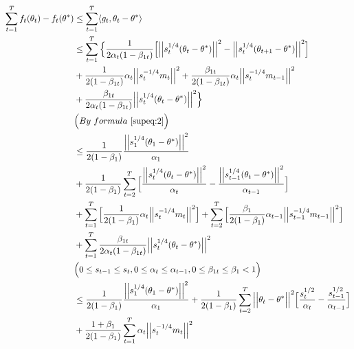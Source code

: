 \documentclass{article}
\begin{document}
\begin{align}
\label{supeq:3}
\sum_{t=1}^T f_t(\theta_t) - f_t(\theta^*) & \leq \sum_{t=1}^T\langle g_t, \theta_t - \theta^* \rangle \nonumber \\
& \leq \sum_{t=1}^T \Big \{ \frac{1}{2 \alpha_t (1- \beta_{1t})} \Big[ \Big \vert \Big \vert s_t^{1/4} (\theta_t - \theta^*)\Big \vert \Big \vert^2 - \Big \vert \Big \vert s_t^{1/4}(\theta_{t+1} - \theta^*) \Big \vert \Big \vert^2 \Big] \nonumber \\
&+ \frac{1}{2(1-\beta_{1t})} \alpha_t \Big \vert \Big \vert s_t^{-1/4}m_t \Big \vert \Big \vert^2 + \frac{\beta_{1t}}{2(1-\beta_{1t})} \alpha_t \Big \vert \Big \vert s_t^{-1/4} m_{t-1} \Big \vert \Big \vert^2 \nonumber \\
&+ \frac{\beta_{1t}}{2 \alpha_t (1-\beta_{1t})} \Big \vert \Big \vert s_t^{1/4}(\theta_t - \theta^*) \Big \vert \Big \vert^2 \Big \} \nonumber \\
&\Big( By\  formula ~\eqref{supeq:2} \Big) \nonumber \\
& \leq \frac{1}{2 (1 - \beta_1)} \frac{\Big \vert \Big \vert s_1^{1/4}(\theta_{1} - \theta^*) \Big \vert \Big \vert^2} {\alpha_1} \nonumber \\
& + \frac{1}{2 (1-\beta_1)} \sum_{t=2}^T \Big[ \frac{\Big \vert \Big \vert s_t^{1/4}(\theta_t - \theta^*) \Big \vert \Big \vert^2}{\alpha_t} - \frac{\Big \vert \Big \vert s_{t-1}^{1/4}(\theta_t - \theta^*) \Big \vert \Big \vert^2}{\alpha_{t-1}}  \Big ] \nonumber \\
&+ \sum_{t=1}^T \Big [ \frac{1}{2 (1 - \beta_1)} \alpha_t \Big \vert \Big \vert s_t^{-1/4} m_t \Big \vert \Big \vert^2 \Big] + \sum_{t=2}^T \Big[ \frac{\beta_1}{2 (1 - \beta_1)} \alpha_{t-1} \Big \vert \Big \vert s_{t-1}^{-1/4} m_{t-1} \Big \vert \Big \vert^2 \Big ] \nonumber \\
& + \sum_{t=1}^T \frac{\beta_{1t}}{2 \alpha_t (1-\beta_{1t})} \Big \vert \Big \vert s_t^{1/4}(\theta_t - \theta^*) \Big \vert \Big \vert^2 \nonumber \\
& \Big( 0\leq s_{t-1} \leq s_t, 0 \leq \alpha_t \leq \alpha_{t-1}, 0 \leq \beta_{1t} \leq \beta_1 < 1 \Big) \nonumber \\
&\leq \frac{1}{2 (1 - \beta_1)} \frac{\Big \vert \Big \vert s_1^{1/4}(\theta_{1} - \theta^*) \Big \vert \Big \vert^2} {\alpha_1} + \frac{1}{2(1-\beta_1)} \sum_{t=2}^T \Big \vert \Big \vert \theta_t - \theta^* \Big \vert \Big \vert^2 \Big[ \frac{s_t^{1/2}}{\alpha_t} - \frac{s_{t-1}^{1/2}}{\alpha_{t-1}} \Big] \nonumber \\
&+ \frac{1+\beta_1}{2(1-\beta_1)} \sum_{t=1}^T \alpha_t \Big \vert \Big \vert s_t^{-1/4}m_t \Big \vert \Big \vert^2 \nonumber \\

\end{align}
\end{document}
